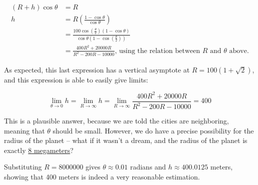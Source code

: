 \documentclass[11pt]{article} %
\begin{document}
\begin{align*}
(R + h)\cos\theta & = R \\
h & = R\left(\frac{1 - \cos\theta}{\cos\theta}\right) \\
& = \frac{100 \cos \left(\frac{\theta}{2}\right)(1 - \cos\theta)}{\cos\theta (1 - \cos \left(\frac{\theta}{2}\right))} \\
& = \frac{400R^2 + 20000R}{R^2 - 200R - 10000} \text{, using the relation between } R \text{ and } \theta \text{ above.}
\end{align*}

As expected, this last expression has a vertical asymptote at $R = 100(1 + \sqrt2)$, and this expression is able to
easily give limits:

$$\lim_{\theta \to 0} h = \lim_{R \to \infty} h = \lim_{R \to \infty} \frac{400R^2 + 20000R}{R^2 - 200R - 10000} = 400$$

This is a plausible answer, because we are told the cities are neighboring, meaning that $\theta$ should be small.
However, we do have a precise possibility for the radius of the planet -- what if it wasn't a dream, and the radius
of the planet is exactly \href{https://fivethirtyeight.com/features/can-you-reach-the-target-number/}{8 megameters}?

Substituting $R = 8000000$ gives $\theta \approx 0.01$ radians and $h \approx 400.0125$ meters, showing that
400 meters is indeed a very reasonable estimation.
\end{document}
